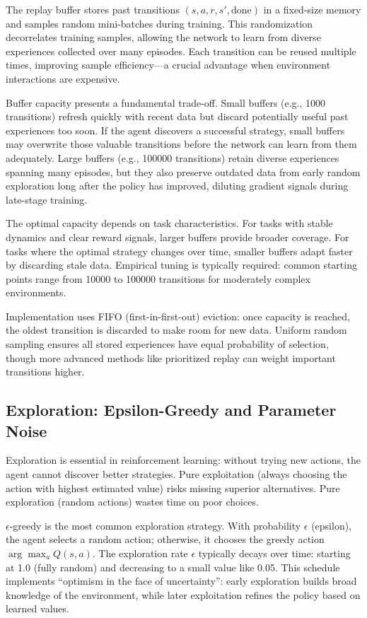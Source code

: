 The replay buffer stores past transitions $(s, a, r, s', \text{done})$ in a fixed-size memory and samples random mini-batches during training. This randomization decorrelates training samples, allowing the network to learn from diverse experiences collected over many episodes. Each transition can be reused multiple times, improving sample efficiency---a crucial advantage when environment interactions are expensive.

Buffer capacity presents a fundamental trade-off. Small buffers (e.g., 1000 transitions) refresh quickly with recent data but discard potentially useful past experiences too soon. If the agent discovers a successful strategy, small buffers may overwrite those valuable transitions before the network can learn from them adequately. Large buffers (e.g., 100000 transitions) retain diverse experiences spanning many episodes, but they also preserve outdated data from early random exploration long after the policy has improved, diluting gradient signals during late-stage training.

The optimal capacity depends on task characteristics. For tasks with stable dynamics and clear reward signals, larger buffers provide broader coverage. For tasks where the optimal strategy changes over time, smaller buffers adapt faster by discarding stale data. Empirical tuning is typically required: common starting points range from 10000 to 100000 transitions for moderately complex environments.

Implementation uses FIFO (first-in-first-out) eviction: once capacity is reached, the oldest transition is discarded to make room for new data. Uniform random sampling ensures all stored experiences have equal probability of selection, though more advanced methods like prioritized replay can weight important transitions higher.

\subsection{Exploration: Epsilon-Greedy and Parameter Noise}

Exploration is essential in reinforcement learning: without trying new actions, the agent cannot discover better strategies. Pure exploitation (always choosing the action with highest estimated value) risks missing superior alternatives. Pure exploration (random actions) wastes time on poor choices.

$\epsilon$-greedy is the most common exploration strategy. With probability $\epsilon$ (epsilon), the agent selects a random action; otherwise, it chooses the greedy action $\arg\max_a Q(s,a)$. The exploration rate $\epsilon$ typically decays over time: starting at 1.0 (fully random) and decreasing to a small value like 0.05. This schedule implements ``optimism in the face of uncertainty'': early exploration builds broad knowledge of the environment, while later exploitation refines the policy based on learned values.

